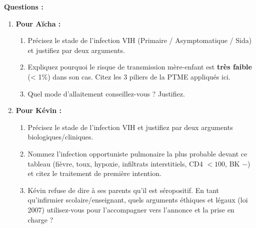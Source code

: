 \documentclass[11pt]{article}
\begin{document}
\begin{exercice}
\textbf{Questions :}
\begin{enumerate}
    \item \textbf{Pour Aïcha :}
    \begin{enumerate}
        \item Précisez le stade de l'infection VIH (Primaire / Asymptomatique / Sida) et justifiez par deux arguments.
        \item Expliquez pourquoi le risque de transmission mère-enfant est \textbf{très faible} (< 1\%) dans son cas. Citez les 3 piliers de la PTME appliqués ici.
        \item Quel mode d'allaitement conseillez-vous ? Justifiez.
    \end{enumerate}
    \item \textbf{Pour Kévin :}
    \begin{enumerate}
        \item Précisez le stade de l'infection VIH et justifiez par deux arguments biologiques/cliniques.
        \item Nommez l'infection opportuniste pulmonaire la plus probable devant ce tableau (fièvre, toux, hypoxie, infiltrats interstitiels, CD4 $< 100$, BK $-$) et citez le traitement de première intention.
        \item Kévin refuse de dire à ses parents qu'il est séropositif. En tant qu'infirmier scolaire/enseignant, quels arguments éthiques et légaux (loi 2007) utilisez-vous pour l'accompagner vers l'annonce et la prise en charge ?
    \end{enumerate}
\end{enumerate}
\end{exercice}
\end{document}

